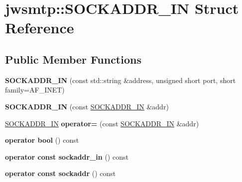 \hypertarget{structjwsmtp_1_1SOCKADDR__IN}{\section{jwsmtp\-:\-:S\-O\-C\-K\-A\-D\-D\-R\-\_\-\-I\-N Struct Reference}
\label{structjwsmtp_1_1SOCKADDR__IN}
}
\subsection*{Public Member Functions}
\begin{DoxyCompactItemize}
\item 
\hypertarget{structjwsmtp_1_1SOCKADDR__IN_acc8e9b5dd53ebd6df566f141deb04dbf}{{\bfseries S\-O\-C\-K\-A\-D\-D\-R\-\_\-\-I\-N} (const std\-::string \&address, unsigned short port, short family=A\-F\-\_\-\-I\-N\-E\-T)}\label{structjwsmtp_1_1SOCKADDR__IN_acc8e9b5dd53ebd6df566f141deb04dbf}

\item 
\hypertarget{structjwsmtp_1_1SOCKADDR__IN_a600e2092c64ea21893b1bb1446de0dd6}{{\bfseries S\-O\-C\-K\-A\-D\-D\-R\-\_\-\-I\-N} (const \hyperlink{structjwsmtp_1_1SOCKADDR__IN}{S\-O\-C\-K\-A\-D\-D\-R\-\_\-\-I\-N} \&addr)}\label{structjwsmtp_1_1SOCKADDR__IN_a600e2092c64ea21893b1bb1446de0dd6}

\item 
\hypertarget{structjwsmtp_1_1SOCKADDR__IN_a65ac978b686ce5077f7bf084ce2a8a92}{\hyperlink{structjwsmtp_1_1SOCKADDR__IN}{S\-O\-C\-K\-A\-D\-D\-R\-\_\-\-I\-N} {\bfseries operator=} (const \hyperlink{structjwsmtp_1_1SOCKADDR__IN}{S\-O\-C\-K\-A\-D\-D\-R\-\_\-\-I\-N} \&addr)}\label{structjwsmtp_1_1SOCKADDR__IN_a65ac978b686ce5077f7bf084ce2a8a92}

\item 
\hypertarget{structjwsmtp_1_1SOCKADDR__IN_a883ebbb530c08261aecfb81da3837bc2}{{\bfseries operator bool} () const }\label{structjwsmtp_1_1SOCKADDR__IN_a883ebbb530c08261aecfb81da3837bc2}

\item 
\hypertarget{structjwsmtp_1_1SOCKADDR__IN_aaa8635472b494bfdf51fdfcefd28f0cf}{{\bfseries operator const sockaddr\-\_\-in} () const }\label{structjwsmtp_1_1SOCKADDR__IN_aaa8635472b494bfdf51fdfcefd28f0cf}

\item 
\hypertarget{structjwsmtp_1_1SOCKADDR__IN_a36659eb6c2d8d7b3c2f0a58f47d58b19}{{\bfseries operator const sockaddr} () const }\label{structjwsmtp_1_1SOCKADDR__IN_a36659eb6c2d8d7b3c2f0a58f47d58b19}


\end{DoxyCompactItemize}
